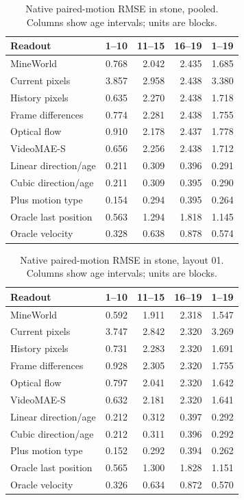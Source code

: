 \begin{table}[!htbp]
\centering\small
\caption{Native paired-motion RMSE in stone, pooled. Columns show age intervals; units are blocks.}
\label{tab:motion-L4-pooled}
\begin{tabular}{@{}lrrrr@{}}
\toprule
Readout & 1--10 & 11--15 & 16--19 & 1--19\\
\midrule
MineWorld & 0.768 & 2.042 & 2.435 & 1.685\\
Current pixels & 3.857 & 2.958 & 2.438 & 3.380\\
History pixels & 0.635 & 2.270 & 2.438 & 1.718\\
Frame differences & 0.774 & 2.281 & 2.438 & 1.755\\
Optical flow & 0.910 & 2.178 & 2.437 & 1.778\\
VideoMAE-S & 0.656 & 2.256 & 2.438 & 1.712\\
Linear direction/age & 0.211 & 0.309 & 0.396 & 0.291\\
Cubic direction/age & 0.211 & 0.309 & 0.395 & 0.290\\
Plus motion type & 0.154 & 0.294 & 0.395 & 0.264\\
Oracle last position & 0.563 & 1.294 & 1.818 & 1.145\\
Oracle velocity & 0.328 & 0.638 & 0.878 & 0.574\\
\bottomrule
\end{tabular}
\end{table}

\begin{table}[!htbp]
\centering\small
\caption{Native paired-motion RMSE in stone, layout 01. Columns show age intervals; units are blocks.}
\label{tab:motion-L4-layout_01}
\begin{tabular}{@{}lrrrr@{}}
\toprule
Readout & 1--10 & 11--15 & 16--19 & 1--19\\
\midrule
MineWorld & 0.592 & 1.911 & 2.318 & 1.547\\
Current pixels & 3.747 & 2.842 & 2.320 & 3.269\\
History pixels & 0.731 & 2.283 & 2.320 & 1.691\\
Frame differences & 0.928 & 2.305 & 2.320 & 1.755\\
Optical flow & 0.797 & 2.041 & 2.320 & 1.642\\
VideoMAE-S & 0.632 & 2.181 & 2.320 & 1.641\\
Linear direction/age & 0.212 & 0.312 & 0.397 & 0.292\\
Cubic direction/age & 0.212 & 0.311 & 0.396 & 0.292\\
Plus motion type & 0.152 & 0.292 & 0.394 & 0.262\\
Oracle last position & 0.565 & 1.300 & 1.828 & 1.151\\
Oracle velocity & 0.326 & 0.634 & 0.872 & 0.570\\
\bottomrule
\end{tabular}
\end{table}

